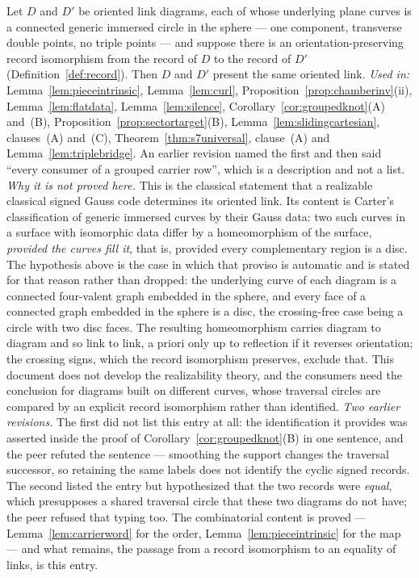 \begin{axiom}\label{ax:gausscode}
Let $D$ and $D'$ be oriented link diagrams, each of whose underlying plane
curves is a connected generic immersed circle in the sphere --- one component,
transverse double points, no triple points --- and suppose there is an
orientation-preserving record isomorphism from the record of $D$ to the record
of $D'$ (Definition~\ref{def:record}). Then $D$ and $D'$ present the same
oriented link.
\emph{Used in:} Lemma~\ref{lem:pieceintrinsic}, Lemma~\ref{lem:curl},
Proposition~\ref{prop:chamberinv}(ii), Lemma~\ref{lem:flatdata},
Lemma~\ref{lem:silence}, Corollary~\ref{cor:groupedknot}(A) and~(B),
Proposition~\ref{prop:sectortarget}(B),
Lemma~\ref{lem:slidingcartesian},
clauses~(A) and~(C), Theorem~\ref{thm:s7universal}, clause~(A) and
Lemma~\ref{lem:triplebridge}. An earlier revision named the first and then said
``every consumer of a grouped carrier row'', which is a description and not a
list.
\emph{Why it is not proved here.} This is the classical statement that a
realizable classical signed Gauss code determines its oriented link. Its content
is Carter's classification of generic immersed curves by their Gauss data: two
such curves in a surface with isomorphic data differ by a homeomorphism of the
surface, \emph{provided the curves fill it}, that is, provided every
complementary region is a disc. The hypothesis above is the case in which that
proviso is automatic and is stated for that reason rather than dropped: the
underlying curve of each diagram is a connected four-valent graph embedded in
the sphere, and every face of a connected graph embedded in the sphere is a
disc, the crossing-free case being a circle with two disc faces. The resulting
homeomorphism carries diagram to diagram and so link to link, a priori only up
to reflection if it reverses orientation; the crossing signs, which the record
isomorphism preserves, exclude that. This document does not develop the
realizability theory, and the consumers need the conclusion for diagrams built
on different curves, whose traversal circles are compared by an explicit record
isomorphism rather than identified.
\emph{Two earlier revisions.} The first did not list this entry at all: the
identification it provides was asserted inside the proof of
Corollary~\ref{cor:groupedknot}(B) in one sentence, and the peer refuted the
sentence --- smoothing the support changes the traversal successor, so retaining
the same labels does not identify the cyclic signed records. The second listed
the entry but hypothesized that the two records were \emph{equal}, which
presupposes a shared traversal circle that these two diagrams do not have; the
peer refused that typing too. The combinatorial content is proved ---
Lemma~\ref{lem:carrierword} for the order, Lemma~\ref{lem:pieceintrinsic} for
the map --- and what remains, the passage from a record isomorphism to an
equality of links, is this entry.
\end{axiom}

